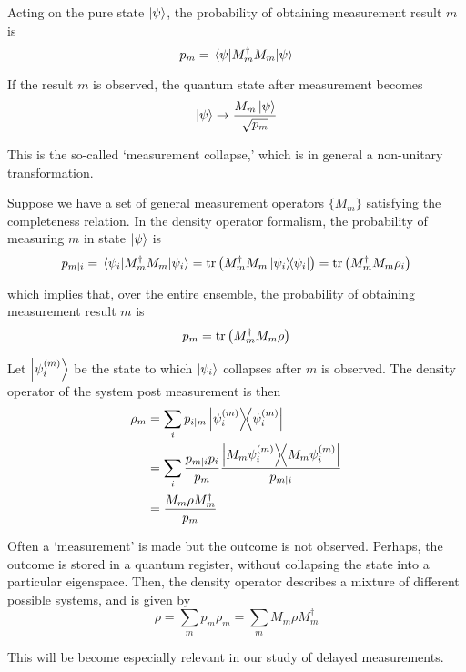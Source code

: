 \documentclass[10pt]{article}
\begin{document}
Acting on the pure state $\ket{\psi}$, the probability of obtaining measurement result $m$ is
\begin{equation}
p_m = \ev{M_m^\dagger M_m}{\psi}
\end{equation}

If the result $m$ is observed, the quantum state after measurement becomes
\begin{equation}
\ket{\psi} \rightarrow \frac{M_m \ket{\psi}}{\sqrt{p_m}}
\label{eq_collapse}
\end{equation}

This is the so-called `measurement collapse,' which is in general a non-unitary transformation.

Suppose we have a set of general measurement operators $\{M_m\}$ satisfying the completeness relation. In the density operator formalism, the probability of measuring $m$ in state $\ket{\psi}$ is
\begin{equation}
p_{m|i} 
= \ev{M_m^\dagger M_m}{\psi_i} 
= \trace{\left( M_m^\dagger M_m \dyad{\psi_i} \right)}
= \trace{\left( M_m^\dagger M_m \rho_i \right)}
\end{equation}

which implies that, over the entire ensemble, the probability of obtaining measurement result $m$ is
\begin{equation}
p_m =\trace{\left( M_m^\dagger M_m \rho \right)}
\end{equation}

Let $\ket{\psi_i^{(m)}}$ be the state to which $\ket{\psi_i}$ collapses after $m$ is observed. The density operator of the system post measurement is then
\begin{align}
\rho_m 
&= \sum_i p_{i|m} \dyad{\psi_i^{(m)}} \\
&= \sum_i \frac{p_{m|i} p_i}{p_m} \frac{\dyad{M_m \psi_i^{(m)}}}{p_{m|i}} \\
&= \frac{M_m \rho M_m^\dagger}{p_m}
\end{align}

Often a `measurement' is made but the outcome is not observed. Perhaps, the outcome is stored in a quantum register, without collapsing the state into a particular eigenspace. Then, the density operator describes a mixture of different possible systems, and is given by
\begin{equation}
\rho = \sum_m p_m \rho_m = \sum_m M_m \rho M_m^\dagger 
\end{equation}

This will be become especially relevant in our study of delayed measurements.
\end{document}
